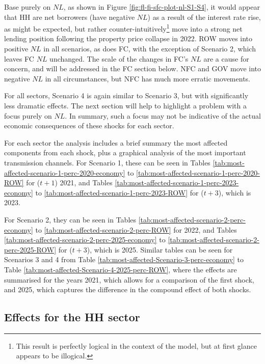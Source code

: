 \documentclass[
]{book}
\begin{document}
Base purely on \(NL\), as shown in Figure \ref{fig:fl-fi-sfc-plot-nl-S1-S4}, it would appear that HH are net borrowers (have negative \(NL\)) as a result of the interest rate rise, as might be expected, but rather counter-intuitively\footnote{This result is perfectly logical in the context of the model, but at first glance appears to be illogical.} move into a strong net lending position following the property price collapse in 2022. ROW moves into positive \(NL\) in all scenarios, as does FC, with the exception of Scenario 2, which leaves FC \(NL\) unchanged. The scale of the changes in FC's \(NL\) are a cause for concern, and will be addressed in the FC section below. NFC and GOV move into negative \(NL\) in all circumstances, but NFC has much more erratic movements.

For all sectors, Scenario 4 is again similar to Scenario 3, but with significantly less dramatic effects. The next section will help to highlight a problem with a focus purely on \(NL\). In summary, such a focus may not be indicative of the actual economic consequences of these shocks for each sector.

For each sector the analysis includes a brief summary the most affected components from each shock, plus a graphical analysis of the most important transmission channels. For Scenario 1, these can be seen in Tables \ref{tab:most-affected-scenario-1-perc-2020-economy} to \ref{tab:most-affected-scenario-1-perc-2020-ROW} for (\(t + 1\)) 2021, and Tables \ref{tab:most-affected-scenario-1-perc-2023-economy} to \ref{tab:most-affected-scenario-1-perc-2023-ROW} for (\(t+3\)), which is 2023.

For Scenario 2, they can be seen in Tables \ref{tab:most-affected-scenario-2-perc-economy} to \ref{tab:most-affected-scenario-2-perc-ROW} for 2022, and Tables \ref{tab:most-affected-scenario-2-perc-2025-economy} to \ref{tab:most-affected-scenario-2-perc-2025-ROW} for (\(t+3\)), which is 2025. Similar tables can be seen for Scenarios 3 and 4 from Table \ref{tab:most-affected-Scenario-3-perc-economy} to Table \ref{tab:most-affected-Scenario-4-2025-perc-ROW}, where the effects are summarised for the years 2021, which allows for a comparison of the first shock, and 2025, which captures the difference in the compound effect of both shocks.

\hypertarget{effects-for-the-hh-sector}{%
\subsection{Effects for the HH sector}\label{effects-for-the-hh-sector}}
\end{document}
